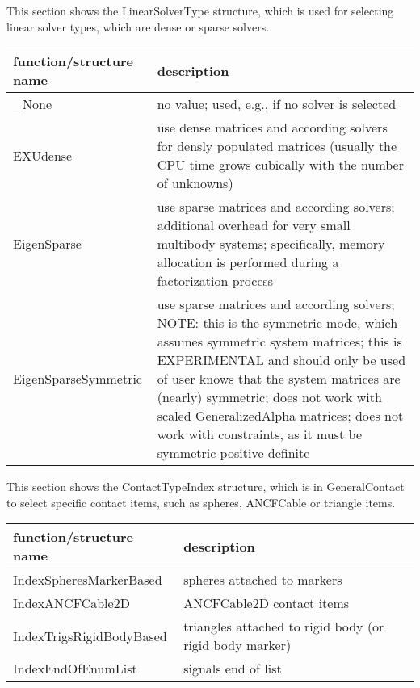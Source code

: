\label{sec:LinearSolverType}
This section shows the LinearSolverType structure, which is used for selecting linear solver types, which are dense or sparse solvers.



\begin{center}
\footnotesize
\begin{longtable}{| p{8cm} | p{8cm} |} 
\hline
{\bf function/structure name} & {\bf description}\\ \hline
  \_None & no value; used, e.g., if no solver is selected\\ \hline  
  EXUdense & use dense matrices and according solvers for densly populated matrices (usually the CPU time grows cubically with the number of unknowns)\\ \hline  
  EigenSparse & use sparse matrices and according solvers; additional overhead for very small multibody systems; specifically, memory allocation is performed during a factorization process\\ \hline  
  EigenSparseSymmetric & use sparse matrices and according solvers; NOTE: this is the symmetric mode, which assumes symmetric system matrices; this is EXPERIMENTAL and should only be used of user knows that the system matrices are (nearly) symmetric; does not work with scaled GeneralizedAlpha matrices; does not work with constraints, as it must be symmetric positive definite\\ \hline  
\end{longtable}
\end{center}

\label{sec:ContactTypeIndex}
This section shows the ContactTypeIndex structure, which is in GeneralContact to select specific contact items, such as spheres, ANCFCable or triangle items.



\begin{center}
\footnotesize
\begin{longtable}{| p{8cm} | p{8cm} |} 
\hline
{\bf function/structure name} & {\bf description}\\ \hline
  IndexSpheresMarkerBased & spheres attached to markers\\ \hline  
  IndexANCFCable2D & ANCFCable2D contact items\\ \hline  
  IndexTrigsRigidBodyBased & triangles attached to rigid body (or rigid body marker)\\ \hline  
  IndexEndOfEnumList & signals end of list\\ \hline  
\end{longtable}
\end{center}
